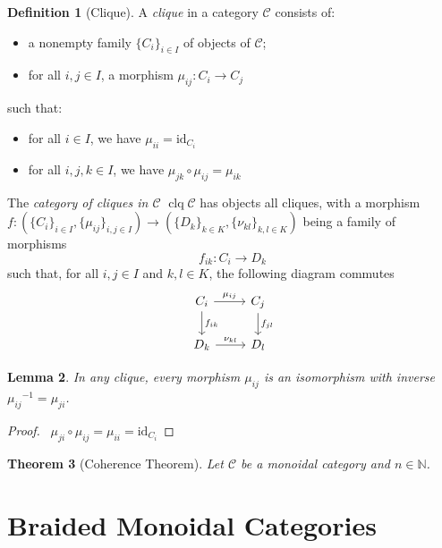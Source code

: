 \documentclass{book}
\newtheorem{lm}{Lemma}[chapter]
\newtheorem{thm}[lm]{Theorem}
\theoremstyle{definition}
\newtheorem{df}[lm]{Definition}
\newcommand{\id}[1]{\ensuremath{\mathrm{id}_{#1}}}
\newcommand{\inv}[1]{\ensuremath{{#1}^{-1}}}
\begin{document}
  \begin{df}[Clique]
    A \emph{clique} in a category $\mathcal{C}$ consists of:
    \begin{itemize}
      \item a nonempty family $\{ C_i \}_{i \in I}$ of objects of $\mathcal{C}$;
      \item for all $i, j \in I$, a morphism $\mu_{ij} : C_i \rightarrow C_j$
    \end{itemize}
    such that:
    \begin{itemize}
      \item for all $i \in I$, we have $\mu_{ii} = \id{C_i}$
      \item for all $i, j, k \in I$, we have $\mu_{jk} \circ \mu_{ij} = 
      \mu_{ik}$
    \end{itemize}
    
    The \emph{category of cliques in $\mathcal{C}$} $\operatorname{clq} 
    \mathcal{C}$ has objects all cliques, with a morphism $f : (\{ C_i \}_{i 
      \in 
      I}, \{ \mu_{ij} \}_{i,j \in I}) \rightarrow (\{ D_k \}_{k \in K}, \{ 
    \nu_{kl} 
    \}_{k,l \in K})$ being a family of morphisms
    \[ f_{ik} : C_i \rightarrow D_k \]
    such that, for all $i, j \in I$ and $k, l \in K$, the following diagram 
    commutes
    \[ \begin{tikzcd}
      C_i \ar[r, "\mu_{ij}"] \ar[d, "f_{ik}"] & C_j \ar[d, "f_{jl}"] \\
      D_k \ar[r, "\nu_{kl}"] & D_l
    \end{tikzcd} \]
  \end{df}
  
  \begin{lm}
    In any clique, every morphism $\mu_{ij}$ is an isomorphism with inverse 
    $\inv{\mu_{ij}} = \mu_{ji}$.
  \end{lm}
  
  \begin{proof}
    \pf\ $\mu_{ji} \circ \mu_{ij} = \mu_{ii} = \id{C_i}$
  \end{proof}
  
  \begin{thm}[Coherence Theorem]
    Let $\mathcal{C}$ be a monoidal category and $n \in \mathbb{N}$. 
  \end{thm}
  
  \section{Braided Monoidal Categories}
  
\end{document}
